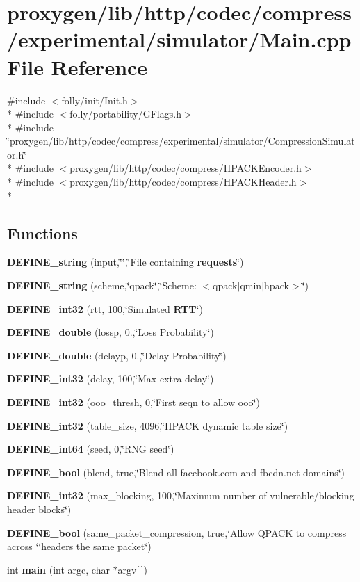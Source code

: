 \section{proxygen/lib/http/codec/compress/experimental/simulator/\+Main.cpp File Reference}
\label{Main_8cpp}
{\ttfamily \#include $<$folly/init/\+Init.\+h$>$}\\*
{\ttfamily \#include $<$folly/portability/\+G\+Flags.\+h$>$}\\*
{\ttfamily \#include \char`\"{}proxygen/lib/http/codec/compress/experimental/simulator/\+Compression\+Simulator.\+h\char`\"{}}\\*
{\ttfamily \#include $<$proxygen/lib/http/codec/compress/\+H\+P\+A\+C\+K\+Encoder.\+h$>$}\\*
{\ttfamily \#include $<$proxygen/lib/http/codec/compress/\+H\+P\+A\+C\+K\+Header.\+h$>$}\\*
\subsection*{Functions}
\begin{DoxyCompactItemize}
\item 
{\bf D\+E\+F\+I\+N\+E\+\_\+string} (input,\char`\"{}\char`\"{},\char`\"{}File containing {\bf requests}\char`\"{})
\item 
{\bf D\+E\+F\+I\+N\+E\+\_\+string} (scheme,\char`\"{}qpack\char`\"{},\char`\"{}Scheme\+: $<$qpack$\vert$qmin$\vert$hpack$>$\char`\"{})
\item 
{\bf D\+E\+F\+I\+N\+E\+\_\+int32} (rtt, 100,\char`\"{}Simulated {\bf R\+TT}\char`\"{})
\item 
{\bf D\+E\+F\+I\+N\+E\+\_\+double} (lossp, 0.,\char`\"{}Loss Probability\char`\"{})
\item 
{\bf D\+E\+F\+I\+N\+E\+\_\+double} (delayp, 0.,\char`\"{}Delay Probability\char`\"{})
\item 
{\bf D\+E\+F\+I\+N\+E\+\_\+int32} (delay, 100,\char`\"{}Max extra delay\char`\"{})
\item 
{\bf D\+E\+F\+I\+N\+E\+\_\+int32} (ooo\+\_\+thresh, 0,\char`\"{}First seqn to allow ooo\char`\"{})
\item 
{\bf D\+E\+F\+I\+N\+E\+\_\+int32} (table\+\_\+size, 4096,\char`\"{}H\+P\+A\+CK dynamic table size\char`\"{})
\item 
{\bf D\+E\+F\+I\+N\+E\+\_\+int64} (seed, 0,\char`\"{}R\+NG seed\char`\"{})
\item 
{\bf D\+E\+F\+I\+N\+E\+\_\+bool} (blend, true,\char`\"{}Blend all facebook.\+com and fbcdn.\+net domains\char`\"{})
\item 
{\bf D\+E\+F\+I\+N\+E\+\_\+int32} (max\+\_\+blocking, 100,\char`\"{}Maximum number of vulnerable/blocking header blocks\char`\"{})
\item 
{\bf D\+E\+F\+I\+N\+E\+\_\+bool} (same\+\_\+packet\+\_\+compression, true,\char`\"{}Allow Q\+P\+A\+CK to compress across \char`\"{}\char`\"{}headers the same packet\char`\"{})
\item 
int {\bf main} (int argc, char $\ast$argv[$\,$])
\end{DoxyCompactItemize}


